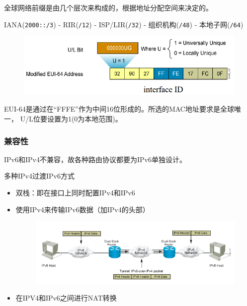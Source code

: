 全球网络前缀是由几个层次来构成的，根据地址分配空间来决定的。
\begin{center}
IANA(\verb'2000::/3') - RIR(\verb'/12') - ISP/LIR(\verb'/32') - 组织机构(\verb'/48') - 本地子网(\verb'/64')
\end{center}

\begin{figure}[H]
	\centering
	\includegraphics[width=0.8\linewidth]{fig/EUI-64.png}
\end{figure}
EUI-64是通过在“FFFE”作为中间16位形成的。所选的MAC地址要求是全球唯一， U/L位要设置为1(0为本地范围)。

\subsubsection{兼容性}
IPv6和IPv4不兼容，故各种路由协议都要为IPv6单独设计。

多种IPv4过渡IPv6方式
\begin{itemize}
\item 双栈：即在接口上同时配置IPv4和IPv6
\item 使用IPv4来传输IPv6数据（加IPv4的头部）
\begin{figure}[H]
	\centering
	\includegraphics[width=0.8\linewidth]{fig/v4-to-v6.png}
\end{figure}
\item 在IPV4和IPv6之间进行NAT转换
\end{itemize}

